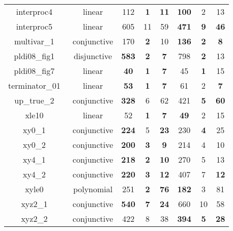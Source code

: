 \begin{table}[t]
\begin{tabular}{l c | c c c | c c c |}
\multicolumn{1}{|c|}{interproc4~\cite{jeannet2010interproc}}	&linear 		&112	&\textbf{1}	&\textbf{11}	&\textbf{100}	&2	&13\\
\multicolumn{1}{|c|}{interproc5~\cite{jeannet2010interproc}}	&linear			&605	&11	&59 &\textbf{471}	&\textbf{9}	&\textbf{46}\\
\multicolumn{1}{|c|}{multivar\_1~\cite{jeannet2010interproc}}	&conjunctive	&170	&\textbf{2}	&10	&\textbf{136}	&\textbf{2}	&\textbf{8}\\
\multicolumn{1}{|c|}{pldi08\_fig1~\cite{gulavani2008automatically}}&disjunctive	&\textbf{583} & \textbf{2} & \textbf{7}   &798 & \textbf{2} & 13						\\
\multicolumn{1}{|c|}{pldi08\_fig7~\cite{gulavani2008automatically}}	&linear		&\textbf{40}	&\textbf{1}	&\textbf{7}	   &45	&\textbf{1}	&15							\\
\multicolumn{1}{|c|}{terminator\_01~\cite{Dirk:SVCOMP:2016}}	&linear 			&\textbf{53}	&\textbf{1}	&\textbf{7}	&61	&2	&\textbf{7}\\
\multicolumn{1}{|c|}{up\_true\_2~\cite{isil2013inductive}}		&conjunctive	&\textbf{328}	&6	&62					   &421	&\textbf{5}	&\textbf{60}				\\
\multicolumn{1}{|c|}{xle10~\cite{sharma2012interpolants}}		&linear 		&52	&\textbf{1}	&\textbf{7}				   &\textbf{49}	&2	&15							\\
\multicolumn{1}{|c|}{xy0\_1~\cite{sharma2012interpolants}}		&conjunctive	&\textbf{224}	&5	&\textbf{23}		   &230	&\textbf{4}	&25							\\
\multicolumn{1}{|c|}{xy0\_2~\cite{sharma2012interpolants}}		&conjunctive	&\textbf{200}	&\textbf{3}	&\textbf{9}	&214	&4	&10\\
\multicolumn{1}{|c|}{xy4\_1~\cite{sharma2012interpolants}}		&conjunctive	&\textbf{218}	&\textbf{2}	&\textbf{10}	&270	&5	&13\\
\multicolumn{1}{|c|}{xy4\_2~\cite{sharma2012interpolants}}		&conjunctive	&\textbf{220}	&\textbf{3}	&\textbf{12}	&407	&7	&\textbf{12}\\
\multicolumn{1}{|c|}{xyle0~\cite{sharma2012interpolants}}		&polynomial 	&251	&\textbf{2}	&\textbf{76}		   &\textbf{182}	&3	&81						\\
\multicolumn{1}{|c|}{xyz2\_1~\cite{sharma2012interpolants}}		&conjunctive	&\textbf{540}	&\textbf{7}	&\textbf{24}	&660	&10	&58\\
\multicolumn{1}{|c|}{xyz2\_2~\cite{sharma2012interpolants}}		&conjunctive	&422	&8	&38							   &\textbf{394}	&\textbf{5}	&\textbf{28}	\\

\end{tabular}
\end{table}
